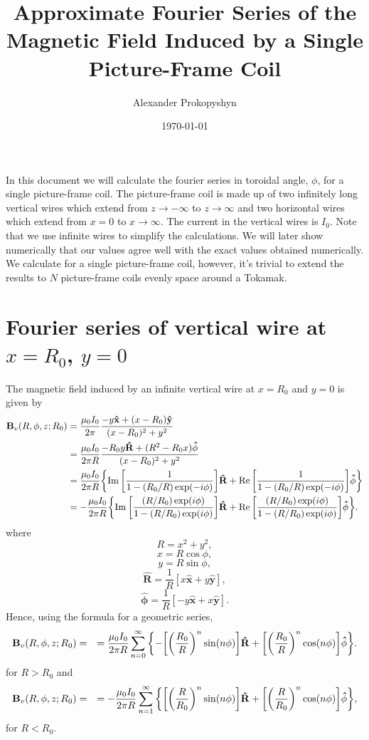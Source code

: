 \documentclass{article}
\title{Approximate Fourier Series of the Magnetic Field Induced by a Single Picture-Frame Coil}
\author{Alexander Prokopyshyn}
\date{\today}
\let\vec\mathbf
\begin{document}
\maketitle

In this document we will calculate the fourier series in toroidal angle, $\phi$, for
a single picture-frame coil. The picture-frame coil is made up 
of two infinitely long vertical wires which extend from $z\rightarrow-\infty$ to
$z\rightarrow\infty$ and two horizontal wires which extend from
$x=0$ to $x\rightarrow\infty$. The current in the vertical wires is $I_0$.
Note that we use infinite wires to simplify the calculations. We will later show
numerically that our values agree well with the exact values obtained numerically.
We calculate for a single picture-frame coil, however, it's trivial to
extend the results to $N$ picture-frame coils evenly space around a Tokamak.

\section{\texorpdfstring{Fourier series of vertical wire at $x=R_0$, $y=0$}{Fourier series of vertical wire at x=R0, y=0}}
\label{sec:vertical_wire_at_origin}

The magnetic field induced by an infinite vertical wire at $x=R_0$ and $y=0$ is given by
\[\begin{aligned}
\vec{B}_v(R, \phi, z; R_0) &= \frac{\mu_0 I_0}{2\pi}\frac{-y\vec{\hat{x}}+(x-R_0)\vec{\hat{y}}}{(x-R_{0})^2+y^2} \\
&= \frac{\mu_0 I_0}{2\pi R}\frac{-R_0 y\vec{\hat{R}}+(R^2-R_0 x)\vec{\hat{\phi}}}{(x-R_{0})^2+y^2} \\
&= \frac{\mu_0 I_0}{2\pi R}\qty{\Im\qty[\frac{1}{1-(R_0/R)\exp(-i\phi)}]\vec{\hat{R}} + \Re\qty[\frac{1}{1-(R_0/R)\exp(-i\phi)}]\vec{\hat{\phi}}} \\
&= -\frac{\mu_0 I_0}{2\pi R}\qty{\Im\qty[\frac{(R/R_0)\exp(i\phi)}{1-(R/R_0)\exp(i\phi)}]\vec{\hat{R}} + \Re\qty[\frac{(R/R_0)\exp(i\phi)}{1-(R/R_0)\exp(i\phi)}]\vec{\hat{\phi}}}.\\
\end{aligned}\]
where
\[R=x^2+y^2,\]
\[x=R\cos\phi,\]
\[y=R\sin\phi,\]
\[\vec{\hat{R}} = \frac{1}{R}[x\vec{\hat{x}}+y\vec{\hat{y}}],\]
\[\vec{\hat{\phi}} = \frac{1}{R}[-y\vec{\hat{x}}+x\vec{\hat{y}}].\]
Hence, using the formula for a geometric series,
\[\begin{aligned}
\vec{B}_v(R, \phi, z; R_0) &= 
&= \frac{\mu_0 I_0}{2\pi R}\sum_{n=0}^{\infty}\qty{-\qty[\qty(\frac{R_0}{R})^n\sin(n\phi)]\vec{\hat{R}}+\qty[\qty(\frac{R_0}{R})^n\cos(n\phi)]\vec{\hat{\phi}}}.\\
\end{aligned}\]
for $R>R_0$ and
\[\begin{aligned}
\vec{B}_v(R, \phi, z; R_0) &= 
&= -\frac{\mu_0 I_0}{2\pi R}\sum_{n=1}^{\infty}\qty{\qty[\qty(\frac{R}{R_0})^n\sin(n\phi)]\vec{\hat{R}}+\qty[\qty(\frac{R}{R_0})^n\cos(n\phi)]\vec{\hat{\phi}}},\\
\end{aligned}\]
for $R<R_0$.
\end{document}
